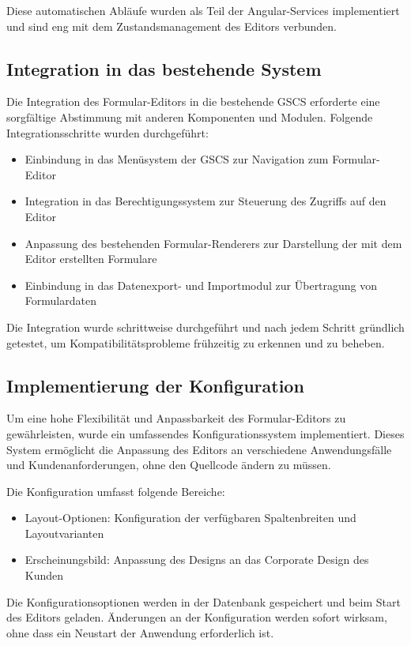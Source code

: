 \documentclass[a4paper,11pt]{article}
\begin{document}
\noindent Diese automatischen Abläufe wurden als Teil der Angular-Services implementiert und sind eng mit dem Zustandsmanagement des Editors verbunden.

\subsection{Integration in das bestehende System}
Die Integration des Formular-Editors in die bestehende GSCS erforderte eine sorgfältige Abstimmung mit anderen Komponenten und Modulen. Folgende Integrationsschritte wurden durchgeführt:

\begin{itemize}
  \item Einbindung in das Menüsystem der GSCS zur Navigation zum Formular-Editor
  \item Integration in das Berechtigungssystem zur Steuerung des Zugriffs auf den Editor
  \item Anpassung des bestehenden Formular-Renderers zur Darstellung der mit dem Editor erstellten Formulare
  \item Einbindung in das Datenexport- und Importmodul zur Übertragung von Formulardaten
\end{itemize}

Die Integration wurde schrittweise durchgeführt und nach jedem Schritt gründlich getestet, um Kompatibilitätsprobleme frühzeitig zu erkennen und zu beheben.

\subsection{Implementierung der Konfiguration}
Um eine hohe Flexibilität und Anpassbarkeit des Formular-Editors zu gewährleisten, wurde ein umfassendes Konfigurationssystem implementiert. Dieses System ermöglicht die Anpassung des Editors an verschiedene Anwendungsfälle und Kundenanforderungen, ohne den Quellcode ändern zu müssen.

Die Konfiguration umfasst folgende Bereiche:
\begin{itemize}
  \item Layout-Optionen: Konfiguration der verfügbaren Spaltenbreiten und Layoutvarianten
  \item Erscheinungsbild: Anpassung des Designs an das Corporate Design des Kunden
\end{itemize}

\noindent Die Konfigurationsoptionen werden in der Datenbank gespeichert und beim Start des Editors geladen. Änderungen an der Konfiguration werden sofort wirksam, ohne dass ein Neustart der Anwendung erforderlich ist.
\end{document}
